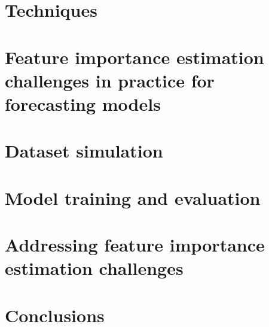 

\section{Techniques}


\section{Feature importance estimation challenges in practice for forecasting models}
\label{sec:feature_importance_estimation_challenges}

\section{Dataset simulation}
\label{sec:dataset_simulation}

\section{Model training and evaluation}
\label{sec:model_training_evaluation}


\section{Addressing feature importance estimation challenges}
\label{sec:addressing_feature_importance_estimation_challenges}

\section{Conclusions}
\label{sec:feature_importance_estimation_conclusions}








